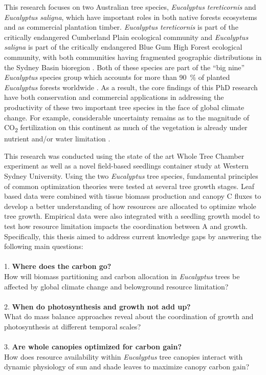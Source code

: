 \documentclass[a4paper]{article}
\begin{document}
This research focuses on two Australian tree species, \textit{Eucalyptus tereticornis} and \textit{Eucalyptus saligna}, which have important roles in both native forests ecosystems and as commercial plantation timber. \textit{Eucalyptus tereticornis} is part of the critically endangered Cumberland Plain ecological community and \textit{Eucalyptus saligna} is part of the critically endangered Blue Gum High Forest ecological community, with both communities having fragmented geographic distributions in the Sydney Basin bioregion \citep{hughes2011web}. Both of these species are part of the “big nine” \textit{Eucalyptus} species group which accounts for more than 90~\% of planted \textit{Eucalyptus} forests worldwide \citep{stanturf2013eucalyptus}. As a result, the core findings of this PhD research have both conservation and commercial applications in addressing the productivity of these two important tree species in the face of global climate change. For example, considerable uncertainty remains as to the magnitude of CO\textsubscript{2} fertilization on this continent as much of the vegetation is already under nutrient and/or water limitation \citep{hughes2003climate}. 

This research was conducted using the state of the art Whole Tree Chamber experiment as well as a novel field-based seedlings container study at Western Sydney University. Using the two \textit{Eucalyptus} tree species, fundamental principles of common optimization theories were tested at several tree growth stages. Leaf based data were combined with tissue biomass production and canopy C fluxes to develop a better understanding of how resources are allocated to optimize whole tree growth. Empirical data were also integrated with a seedling growth model to test how resource limitation impacts the coordination between A and growth. Specifically, this thesis aimed to address current knowledge gaps by answering the following main questions:
\\
\\
1.  \textbf{Where does the carbon go?} 
\\
How will biomass partitioning and carbon allocation in \textit{Eucalyptus} trees be affected by global climate change and belowground resource limitation?
\\
\\
2.  \textbf{When do photosynthesis and growth not add up?}
\\
What do mass balance approaches reveal about the coordination of growth and photosynthesis at different temporal scales?
\\
\\
3.  \textbf{Are whole canopies optimized for carbon gain?}
\\
How does resource availability within \textit{Eucalyptus} tree canopies interact with dynamic physiology of sun and shade leaves to maximize canopy carbon gain?
\end{document}
